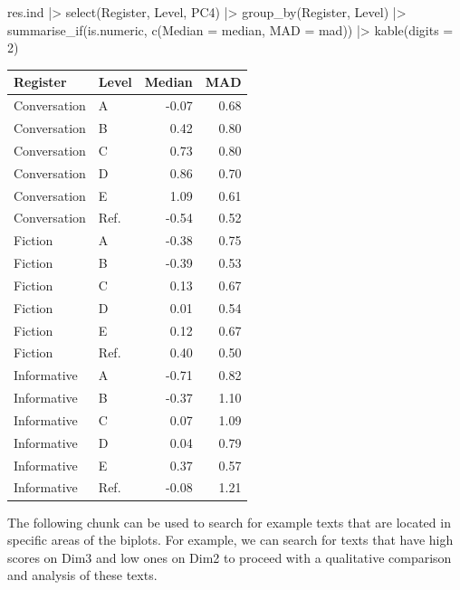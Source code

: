\documentclass[
  letterpaper,
  DIV=11,
  numbers=noendperiod]{scrreprt}
\newenvironment{Shaded}{\begin{snugshade}}{\end{snugshade}}
\newcommand{\AttributeTok}[1]{\textcolor[rgb]{0.40,0.45,0.13}{#1}}
\newcommand{\DecValTok}[1]{\textcolor[rgb]{0.68,0.00,0.00}{#1}}
\newcommand{\FunctionTok}[1]{\textcolor[rgb]{0.28,0.35,0.67}{#1}}
\newcommand{\NormalTok}[1]{\textcolor[rgb]{0.00,0.23,0.31}{#1}}
\newcommand{\SpecialCharTok}[1]{\textcolor[rgb]{0.37,0.37,0.37}{#1}}
\begin{document}
\begin{Shaded}
\begin{Highlighting}[]
\NormalTok{res.ind }\SpecialCharTok{|\textgreater{}} 
  \FunctionTok{select}\NormalTok{(Register, Level, PC4) }\SpecialCharTok{|\textgreater{}} 
  \FunctionTok{group\_by}\NormalTok{(Register, Level) }\SpecialCharTok{|\textgreater{}} 
  \FunctionTok{summarise\_if}\NormalTok{(is.numeric, }\FunctionTok{c}\NormalTok{(}\AttributeTok{Median =}\NormalTok{ median, }\AttributeTok{MAD =}\NormalTok{ mad)) }\SpecialCharTok{|\textgreater{}} 
  \FunctionTok{kable}\NormalTok{(}\AttributeTok{digits =} \DecValTok{2}\NormalTok{)  }
\end{Highlighting}
\end{Shaded}

\begin{longtable}[]{@{}llrr@{}}
\toprule\noalign{}
Register & Level & Median & MAD \\
\midrule\noalign{}
\endhead
\bottomrule\noalign{}
\endlastfoot
Conversation & A & -0.07 & 0.68 \\
Conversation & B & 0.42 & 0.80 \\
Conversation & C & 0.73 & 0.80 \\
Conversation & D & 0.86 & 0.70 \\
Conversation & E & 1.09 & 0.61 \\
Conversation & Ref. & -0.54 & 0.52 \\
Fiction & A & -0.38 & 0.75 \\
Fiction & B & -0.39 & 0.53 \\
Fiction & C & 0.13 & 0.67 \\
Fiction & D & 0.01 & 0.54 \\
Fiction & E & 0.12 & 0.67 \\
Fiction & Ref. & 0.40 & 0.50 \\
Informative & A & -0.71 & 0.82 \\
Informative & B & -0.37 & 1.10 \\
Informative & C & 0.07 & 1.09 \\
Informative & D & 0.04 & 0.79 \\
Informative & E & 0.37 & 0.57 \\
Informative & Ref. & -0.08 & 1.21 \\
\end{longtable}

The following chunk can be used to search for example texts that are
located in specific areas of the biplots. For example, we can search for
texts that have high scores on Dim3 and low ones on Dim2 to proceed with
a qualitative comparison and analysis of these texts.
\end{document}
